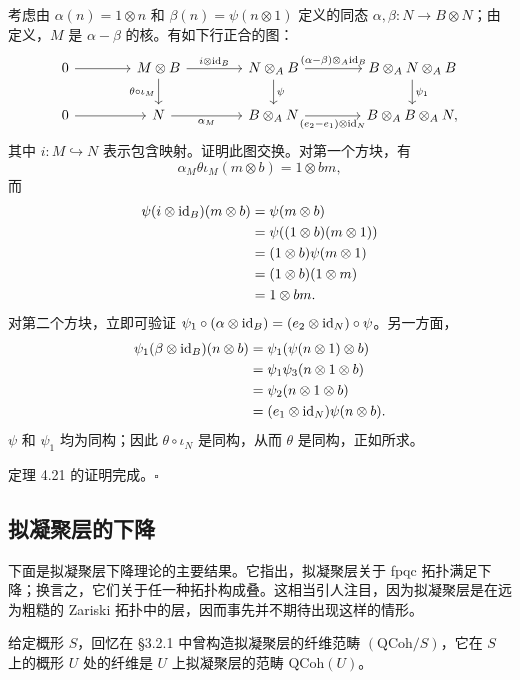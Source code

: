 考虑由 $\alpha(n)=1\otimes n$ 和 $\beta(n)=\psi(n\otimes1)$ 定义的同态 $\alpha,\beta\colon N\to B\otimes N$；由定义，$M$ 是 $\alpha-\beta$ 的核。有如下行正合的图：
\[
\begin{tikzcd}[column sep=4em]
 0\arrow[r]&M\otimes B\arrow[r,"{i\otimes\id_B}"]\arrow[d,"{\theta\circ\iota_M}"']&N\otimes_A B\arrow[r,"{(\alpha-\beta)\otimes_A\id_B}"]\arrow[d,"{\psi}"]&B\otimes_A N\otimes_A B\arrow[d,"{\psi_1}"]\\
 0\arrow[r]&N\arrow[r,"{\alpha_M}"']&B\otimes_A N\arrow[r,"{(e_2-e_1)\otimes\id_N}"']&B\otimes_A B\otimes_A N,
\end{tikzcd}
\]
其中 $i\colon M\hookrightarrow N$ 表示包含映射。证明此图交换。对第一个方块，有
\[
 \alpha_M\theta\iota_M(m\otimes b)=1\otimes bm,
\]
而
\[
\begin{aligned}
 \psi(i\otimes\mathrm{id}_B)(m\otimes b)
 &=\psi(m\otimes b)\\
 &=\psi((1\otimes b)(m\otimes1))\\
 &=(1\otimes b)\psi(m\otimes1)\\
 &=(1\otimes b)(1\otimes m)\\
 &=1\otimes bm.
\end{aligned}
\]
对第二个方块，立即可验证
$\psi_1\circ(\alpha\otimes\mathrm{id}_B)=(e_2\otimes\mathrm{id}_N)\circ\psi$。另一方面，
\[
\begin{aligned}
 \psi_1(\beta\otimes\mathrm{id}_B)(n\otimes b)
 &=\psi_1(\psi(n\otimes1)\otimes b)\\
 &=\psi_1\psi_3(n\otimes1\otimes b)\\
 &=\psi_2(n\otimes1\otimes b)\\
 &=(e_1\otimes\mathrm{id}_N)\psi(n\otimes b).
\end{aligned}
\]
$\psi$ 和 $\psi_1$ 均为同构；因此 $\theta\circ\iota_N$ 是同构，从而 $\theta$ 是同构，正如所求。

定理 4.21 的证明完成。\hfill$\square$

\subsection{拟凝聚层的下降}
下面是拟凝聚层下降理论的主要结果。它指出，拟凝聚层关于 fpqc 拓扑满足下降；换言之，它们关于任一种拓扑构成叠。这相当引人注目，因为拟凝聚层是在远为粗糙的 Zariski 拓扑中的层，因而事先并不期待出现这样的情形。

给定概形 $S$，回忆在 §3.2.1 中曾构造拟凝聚层的纤维范畴 $(\mathrm{QCoh}/S)$，它在 $S$ 上的概形 $U$ 处的纤维是 $U$ 上拟凝聚层的范畴 $\mathrm{QCoh}(U)$。


